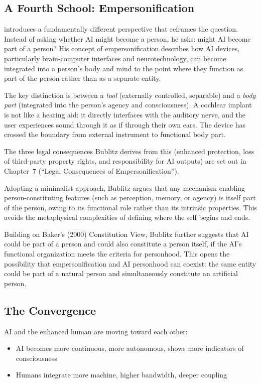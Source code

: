 \documentclass[acmlarge, nonacm]{acmart}
\begin{document}
\subsection{A Fourth School: Empersonification}

\citet{bublitz2024} introduces a fundamentally different perspective that reframes the question. Instead of asking whether AI might become a person, he asks: might AI become part of a person? His concept of empersonification describes how AI devices, particularly brain-computer interfaces and neurotechnology, can become integrated into a person's body and mind to the point where they function as part of the person rather than as a separate entity.

The key distinction is between a \textit{tool} (externally controlled, separable) and a \textit{body part} (integrated into the person's agency and consciousness). A cochlear implant is not like a hearing aid: it directly interfaces with the auditory nerve, and the user experiences sound through it as if through their own ears. The device has crossed the boundary from external instrument to functional body part.

The three legal consequences Bublitz derives from this (enhanced protection, loss of third-party property rights, and responsibility for AI outputs) are set out in Chapter~7 (``Legal Consequences of Empersonification'').

Adopting a minimalist approach, Bublitz argues that any mechanism enabling person-constituting features (such as perception, memory, or agency) is itself part of the person, owing to its functional role rather than its intrinsic properties. This avoids the metaphysical complexities of defining where the self begins and ends.

Building on Baker's (2000) Constitution View, Bublitz further suggests that AI could be part of a person and could also constitute a person itself, if the AI's functional organization meets the criteria for personhood. This opens the possibility that empersonification and AI personhood can coexist: the same entity could be part of a natural person and simultaneously constitute an artificial person.

\subsection{The Convergence}

AI and the enhanced human are moving toward each other:

\begin{itemize}
\item AI becomes more continuous, more autonomous, shows more indicators of consciousness
\item Humans integrate more machine, higher bandwidth, deeper coupling
\end{itemize}
\end{document}
